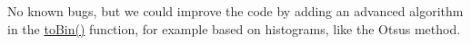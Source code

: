 
\begin{DoxyRefList}
\item[\label{bug__bug000001}%
\Hypertarget{bug__bug000001}%
File \hyperlink{image_8c}{image.c} ]
\item[\label{bug__bug000002}%
\Hypertarget{bug__bug000002}%
File \hyperlink{image_8h}{image.h} ]No known bugs, but we could improve the code by adding an advanced algorithm in the \hyperlink{image_8c_a562c05cc375f753428e6c690580765f8}{to\+Bin()} function, for example based on histograms, like the Otsu\textquotesingle{}s method.  
\item[\label{bug__bug000003}%
\Hypertarget{bug__bug000003}%
File \hyperlink{main_8c}{main.c} ]
\end{DoxyRefList}